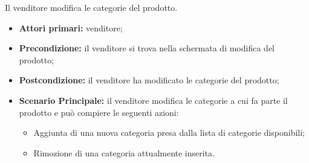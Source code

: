 Il venditore modifica le categorie del prodotto.
\begin{itemize}
    \item \textbf{Attori primari:} venditore;
    \item \textbf{Precondizione:} il venditore si trova nella schermata di modifica del prodotto;
    \item \textbf{Postcondizione:} il venditore ha modificato le categorie del prodotto;
    \item \textbf{Scenario Principale:} il venditore modifica le categorie a cui fa parte il prodotto e può compiere le seguenti azioni:
    \begin{itemize}
        \item Aggiunta di una nuova categoria presa dalla lista di categorie disponibili;%
        \item Rimozione di una categoria attualmente inserita.
    \end{itemize}
\end{itemize}


